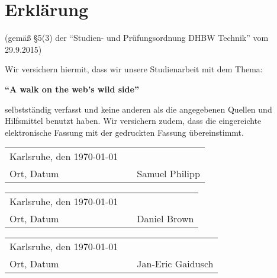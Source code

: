 \chapter*{Erklärung}
\vspace*{2em}

(gemäß §5(3) der \enquote{Studien- und Prüfungsordnung DHBW Technik} vom 29.9.2015)

Wir versichern hiermit, dass wir unsere Studienarbeit mit dem Thema:

\textbf{\enquote{A walk on the web's wild side}}

selbstständig verfasst und keine anderen als die angegebenen Quellen und Hilfsmittel benutzt haben. Wir versichern zudem, dass die eingereichte elektronische Fassung mit der gedruckten Fassung übereinstimmt.

\vspace{3em}

\begin{tabular}{lp{2em}l}
 Karlsruhe, den \today  && \hspace{7cm} \\\cline{1-1}\cline{3-3}
 Ort, Datum     &&  Samuel Philipp
\end{tabular}

\vspace{3em}

\begin{tabular}{lp{2em}l}
 Karlsruhe, den \today  && \hspace{7cm} \\\cline{1-1}\cline{3-3}
 Ort, Datum     &&  Daniel Brown
\end{tabular}

\vspace{3em}

\begin{tabular}{lp{2em}l}
 Karlsruhe, den \today  && \hspace{7cm} \\\cline{1-1}\cline{3-3}
 Ort, Datum     &&  Jan-Eric Gaidusch
\end{tabular}
